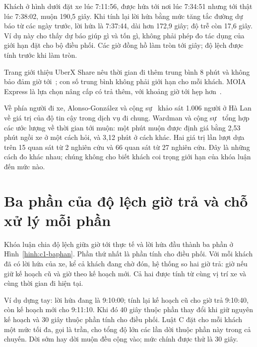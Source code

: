 Khách ở hình dưới đặt xe lúc 7:11:56, được hứa tới nơi lúc 7:34:51 nhưng tới thật lúc 7:38:02, muộn 190,5 giây.
Khi tính lại lời hứa bằng mức tăng tắc đường dự báo từ các ngày trước, lời hứa là 7:37:44, dài hơn 172,9 giây;
độ trễ còn 17,6 giây. Ví dụ này cho thấy dự báo giúp gì và tốn gì, không phải phép đo tác dụng của giới hạn
đặt cho bộ điều phối. Các giờ đồng hồ làm tròn tới giây; độ lệch được tính trước khi làm tròn.

Trang giới thiệu UberX Share nêu thời gian đi thêm trung bình 8 phút và không bảo đảm giờ
tới~\cite{uberxshare}; con số trung bình không phải giới hạn cho mỗi khách.
MOIA Express là lựa chọn nâng cấp có trả thêm, với khoảng giờ tới hẹp hơn~\cite{moiaexpress}.

Về phía người đi xe, Alonso-González và cộng sự~\cite{alonsogonzalez2020} khảo sát 1.006 người ở Hà Lan về giá
trị của độ tin cậy trong dịch vụ đi chung. Wardman và cộng sự~\cite{wardman2026} tổng hợp các ước lượng về
thời gian tới muộn: một phút muộn được định giá bằng 2,53 phút ngồi xe ở một cách hỏi, và 3,12 phút ở cách khác.
Hai giá trị lần lượt dựa trên 15 quan sát từ 2 nghiên cứu và 66 quan sát từ 27 nghiên cứu. Đây là những cách
đo khác nhau; chúng không cho biết khách coi trọng giới hạn của khóa luận đến mức nào.

\section{Ba phần của độ lệch giờ trả và chỗ xử lý mỗi phần}
\label{muc:c1-cauhoi}

Khóa luận chia độ lệch giữa giờ tới thực tế và lời hứa đầu thành ba phần ở Hình~\ref{hinh:c1-baphan}.
Phần thứ nhất là phần tính cho điều phối. Với mỗi khách đã có lời hứa của xe, kể cả khách đang chờ đón, hệ
thống so hai giờ trả: giờ nếu giữ kế hoạch cũ và giờ theo kế hoạch mới. Cả hai được tính từ cùng vị trí xe
và cùng thời gian đi hiện tại.

Ví dụ dựng tay: lời hứa đang là 9:10:00; tính lại kế hoạch cũ cho giờ trả 9:10:40, còn kế hoạch mới cho
9:11:10. Khi đó 40 giây thuộc phần thay đổi khi giữ nguyên kế hoạch và 30 giây thuộc phần tính cho điều phối.
Luật C đặt cho mỗi khách một mức tối đa, gọi là trần, cho tổng độ lớn các lần dời thuộc phần này trong cả
chuyến. Dời sớm hay dời muộn đều cộng vào; mức chính được thử là 30 giây.

